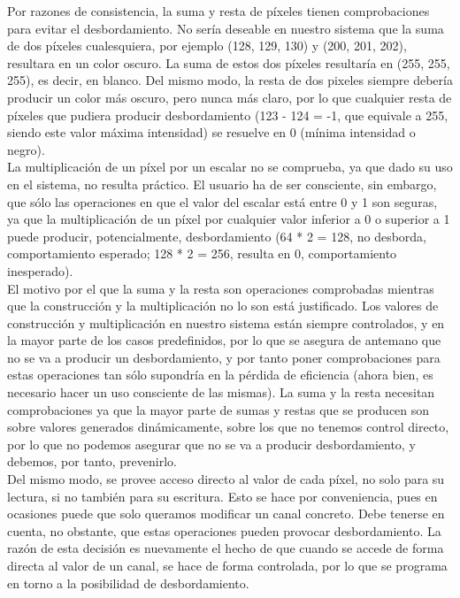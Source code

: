 Por razones de consistencia, la suma y resta de píxeles tienen comprobaciones para evitar el desbordamiento. No sería deseable en nuestro sistema que la suma de dos píxeles cualesquiera, por ejemplo (128, 129, 130) y (200, 201, 202), resultara en un color oscuro. La suma de estos dos píxeles resultaría en (255, 255, 255), es decir, en blanco. Del mismo modo, la resta de dos pixeles siempre debería producir un color más oscuro, pero nunca más claro, por lo que cualquier resta de píxeles que pudiera producir desbordamiento (123 - 124 = -1, que equivale a 255, siendo este valor máxima intensidad) se resuelve en 0 (mínima intensidad o negro).\\

La multiplicación de un píxel por un escalar no se comprueba, ya que dado su uso en el sistema, no resulta práctico. El usuario ha de ser consciente, sin embargo, que sólo las operaciones en que el valor del escalar está entre 0 y 1 son seguras, ya que la multiplicación de un píxel por cualquier valor inferior a 0 o superior a 1 puede producir, potencialmente, desbordamiento (64 * 2 = 128, no desborda, comportamiento esperado; 128 * 2 = 256, resulta en 0, comportamiento inesperado).\\

El motivo por el que la suma y la resta son operaciones comprobadas mientras que la construcción y la multiplicación no lo son está justificado. Los valores de construcción y multiplicación en nuestro sistema están siempre controlados, y en la mayor parte de los casos predefinidos, por lo que se asegura de antemano que no se va a producir un desbordamiento, y por tanto poner comprobaciones para estas operaciones tan sólo supondría en la pérdida de eficiencia (ahora bien, es necesario hacer un uso consciente de las mismas). La suma y la resta necesitan comprobaciones ya que la mayor parte de sumas y restas que se producen son sobre valores generados dinámicamente, sobre los que no tenemos control directo, por lo que no podemos asegurar que no se va a producir desbordamiento, y debemos, por tanto, prevenirlo.\\

Del mismo modo, se provee acceso directo al valor de cada píxel, no solo para su lectura, si no también para su escritura. Esto se hace por conveniencia, pues en ocasiones puede que solo queramos modificar un canal concreto. Debe tenerse en cuenta, no obstante, que estas operaciones pueden provocar desbordamiento. La razón de esta decisión es nuevamente el hecho de que cuando se accede de forma directa al valor de un canal, se hace de forma controlada, por lo que se programa en torno a la posibilidad de desbordamiento.\\

